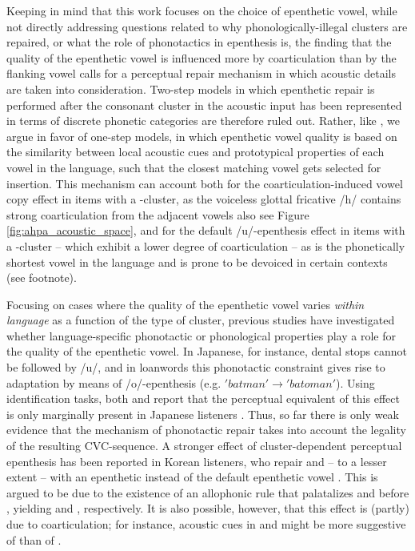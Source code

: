 Keeping in mind that this work focuses on the choice of epenthetic vowel, while not directly addressing questions related to why phonologically-illegal clusters are repaired, or what the role of phonotactics in epenthesis is, the finding that the quality of the epenthetic vowel is influenced more by coarticulation than by the flanking vowel calls for a perceptual repair mechanism in which acoustic details are taken into consideration. Two-step models in which epenthetic repair is performed after the consonant cluster in the acoustic input has been represented in terms of discrete phonetic categories are therefore ruled out. Rather, like \cite{dupoux2011}, we argue in favor of one-step models, in which epenthetic vowel quality is based on the similarity between local acoustic cues and prototypical properties of each vowel in the language, such that the closest matching vowel gets selected for insertion. This mechanism can account both for the coarticulation-induced vowel copy effect in items with a -cluster, as the voiceless glottal fricative /h/ contains strong coarticulation from the adjacent vowels {\color{blue}\cite{keating1988} also see Figure \ref{fig:ahpa_acoustic_space}}, and for the default /u/-epenthesis effect in items with a -cluster -- which exhibit a lower degree of coarticulation -- as  is the phonetically shortest vowel in the language \cite{han1962} and is prone to be devoiced in certain contexts (see footnote).

Focusing on cases where the quality of the epenthetic vowel varies \textit{within language} as a function of the type of cluster, previous studies have investigated whether language-specific phonotactic or phonological properties play a role for the quality of the epenthetic vowel. In Japanese, for instance, dental stops cannot be followed by /u/, and in loanwords this phonotactic constraint gives rise to adaptation by means of /o/-epenthesis (e.g. $'batman' \rightarrow 'batoman'$). Using identification tasks, both \cite{mattingley2015} and \cite{guekozIS17} report that the perceptual equivalent of this effect is only marginally present in Japanese listeners \cite[10-12\% of /o/-epenthesis in /d/-initial clusters; see also][for the absence of such an effect in a discrimination task]{monahan2009}. Thus, so far there is only weak evidence that the mechanism of phonotactic repair takes into account the legality of the resulting CVC-sequence. A stronger effect of cluster-dependent perceptual epenthesis has been reported in Korean listeners, who repair  and -- to a lesser extent --  with an epenthetic  instead of the default epenthetic vowel  \cite{durvasula2015}. This is argued to be due to the existence of an allophonic rule that palatalizes  and  before , yielding \textipa{[Si]} and \textipa{[c\super hi]}, respectively. It is also possible, however, that this effect is (partly) due to coarticulation; for instance, acoustic cues in  and  might be more suggestive of  than of .  

